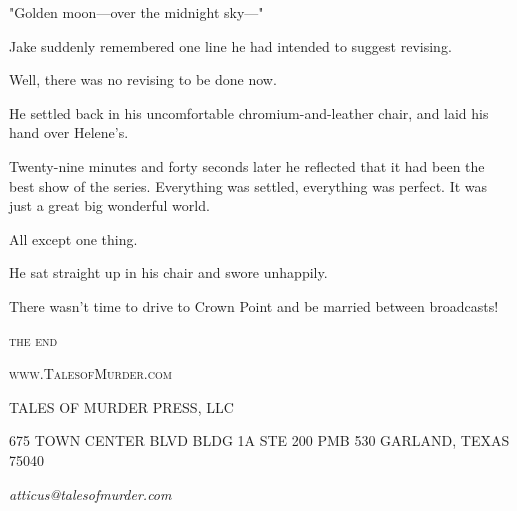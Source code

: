 \documentclass{novel}
\begin{document}
"Golden moon—over the midnight sky—"

Jake suddenly remembered one line he had intended to suggest revising.

Well, there was no revising to be done now.

He settled back in his uncomfortable chromium-and-leather chair, and laid his hand over Helene's.

Twenty-nine minutes and forty seconds later he reflected that it had been the best show of the series. Everything was settled, everything was perfect. It was just a great big wonderful world.

All except one thing.

He sat straight up in his chair and swore unhappily.

There wasn't time to drive to Crown Point and be married between broadcasts!

\vspace{2\nbs}
\clearpage
\thispagestyle{empty}


\scenebreak
\scenebreak
{\centering\textsc{the end}\par}

\clearpage

\null

\centering\textsc{www.TalesofMurder.com}\par

\vspace*{10\nbs}


TALES OF MURDER PRESS, LLC

\null

\scshape{675 TOWN CENTER BLVD
BLDG 1A STE 200 PMB 530
GARLAND, TEXAS 75040}

\null

\textit{atticus@talesofmurder.com}
\vfill
\end{document}
